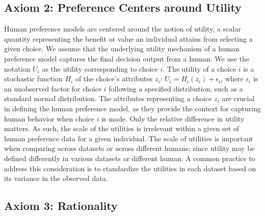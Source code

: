 \documentclass[
  letterpaper,
  numbers=noenddot,
  DIV=11]{scrreprt}
\theoremstyle{definition}
\theoremstyle{plain}
\theoremstyle{plain}
\theoremstyle{remark}
\begin{document}
\subsection*{Axiom 2: Preference Centers around
Utility}\label{axiom-3-preference-centers-around-utility}

Human preference models are centered around the notion of utility, a
scalar quantity representing the benefit or value an individual attains
from selecting a given choice. We assume that the underlying utility
mechanism of a human preference model captures the final decision output
from a human. We use the notation \(U_i\) as the utility corresponding
to choice \(i\). The utility of a choice \(i\) is a stochastic function
\(H_i\) of the choice's attributes \(z_i\):
\(U_i = H_i(z_i) + \epsilon_i\), where \(\epsilon_i\) is an unobserved
factor for choice \(i\) following a specified distribution, such as a
standard normal distribution. The attributes representing a choice
\(z_i\) are crucial in defining the human preference model, as they
provide the context for capturing human behavior when choice \(i\) is
made. Only the relative difference in utility matters. As such, the
scale of the utilities is irrelevant within a given set of human
preference data for a given individual. The scale of utilities is
important when comparing across datasets or across different humans;
since utility may be defined differently in various datasets or
different human. A common practice to address this consideration is to
standardize the utilities in each dataset based on its variance in the
observed data.

\subsection*{Axiom 3: Rationality}\label{human-rationality}
\end{document}
